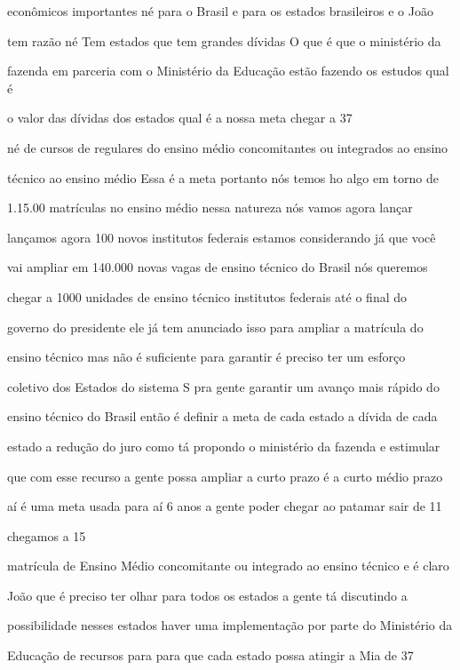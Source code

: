 \documentclass[a4paper,12pt]{article}
\begin{document}
econômicos importantes né para o Brasil e para os estados brasileiros e o João

tem razão né Tem estados que tem grandes dívidas O que é que o ministério da

fazenda em parceria com o Ministério da Educação estão fazendo os estudos qual é

o valor das dívidas dos estados qual é a nossa meta chegar a 37%

né de cursos de regulares do ensino médio concomitantes ou integrados ao ensino

técnico ao ensino médio Essa é a meta portanto nós temos ho algo em torno de

1.15.00 matrículas no ensino médio nessa natureza nós vamos agora lançar

lançamos agora 100 novos institutos federais estamos considerando já que você

vai ampliar em 140.000 novas vagas de ensino técnico do Brasil nós queremos

chegar a 1000 unidades de ensino técnico institutos federais até o final do

governo do presidente ele já tem anunciado isso para ampliar a matrícula do

ensino técnico mas não é suficiente para garantir é preciso ter um esforço

coletivo dos Estados do sistema S pra gente garantir um avanço mais rápido do

ensino técnico do Brasil então é definir a meta de cada estado a dívida de cada

estado a redução do juro como tá propondo o ministério da fazenda e estimular

que com esse recurso a gente possa ampliar a curto prazo é a curto médio prazo

aí é uma meta usada para aí 6 anos a gente poder chegar ao patamar sair de 11%

chegamos a 15%

matrícula de Ensino Médio concomitante ou integrado ao ensino técnico e é claro

João que é preciso ter olhar para todos os estados a gente tá discutindo a

possibilidade nesses estados haver uma implementação por parte do Ministério da

Educação de recursos para para que cada estado possa atingir a Mia de 37%
\end{document}
